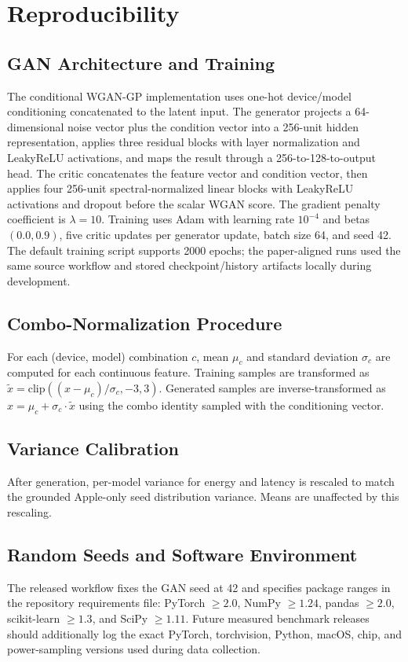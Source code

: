 \documentclass[conference]{IEEEtran}
\begin{document}
\appendices
\section{Reproducibility}
\label{sec:appendix}

\subsection{GAN Architecture and Training}
The conditional WGAN-GP implementation uses one-hot device/model conditioning
concatenated to the latent input. The generator projects a 64-dimensional noise
vector plus the condition vector into a 256-unit hidden representation, applies
three residual blocks with layer normalization and LeakyReLU activations, and
maps the result through a 256-to-128-to-output head. The critic concatenates
the feature vector and condition vector, then applies four 256-unit
spectral-normalized linear blocks with LeakyReLU activations and dropout before
the scalar WGAN score. The gradient penalty coefficient is $\lambda = 10$.
Training uses Adam with learning rate $10^{-4}$ and betas $(0.0, 0.9)$, five
critic updates per generator update, batch size 64, and seed 42. The default
training script supports 2000 epochs; the paper-aligned runs used the same
source workflow and stored checkpoint/history artifacts locally during
development.

\subsection{Combo-Normalization Procedure}
For each (device, model) combination $c$, mean $\mu_c$ and standard deviation
$\sigma_c$ are computed for each continuous feature. Training samples are
transformed as $\tilde{x} = \mathrm{clip}((x - \mu_c)/\sigma_c, -3, 3)$.
Generated samples are inverse-transformed as $x = \mu_c + \sigma_c \cdot \tilde{x}$
using the combo identity sampled with the conditioning vector.

\subsection{Variance Calibration}
After generation, per-model variance for energy and latency is rescaled to
match the grounded Apple-only seed distribution variance. Means are unaffected
by this rescaling.

\subsection{Random Seeds and Software Environment}
The released workflow fixes the GAN seed at 42 and specifies package ranges in
the repository requirements file: PyTorch $\geq 2.0$, NumPy $\geq 1.24$, pandas
$\geq 2.0$, scikit-learn $\geq 1.3$, and SciPy $\geq 1.11$. Future measured
benchmark releases should additionally log the exact PyTorch, torchvision,
Python, macOS, chip, and power-sampling versions used during data collection.
\end{document}
